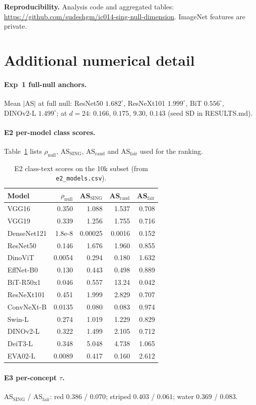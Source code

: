 \documentclass[10pt,twocolumn]{article}
\begin{document}
\vspace{0.4em}
\noindent\textbf{Reproducibility.}
Analysis code and aggregated tables: \url{https://github.com/sudeshgm/ic014-sing-null-dimension}.
ImageNet features are private.

{\small


}

\appendix
\section{Additional numerical detail}
\vspace{-0.2em}
\paragraph{Exp~1 full-null anchors.}
Mean $|$AS$|$ at full null: ResNet50 $1.682^\circ$, ResNeXt101 $1.999^\circ$, BiT $0.556^\circ$, DINOv2-L $1.499^\circ$; at $d{=}24$: $0.166$, $0.175$, $9.30$, $0.143$ (seed SD in RESULTS.md).

\paragraph{E2 per-model class scores.}
Table~\ref{tab:e2models} lists $\rho_{\mathrm{null}}$, $\mathrm{AS}_{\mathrm{SING}}$, $\mathrm{AS}_{\mathrm{rand}}$ and $\mathrm{AS}_{\mathrm{fair}}$ used for the ranking.

\begin{table}[h]
\centering
\scriptsize
\setlength{\tabcolsep}{2.5pt}
\begin{tabular}{@{}lrrrr@{}}
\toprule
Model & $\rho_{\mathrm{null}}$ & AS$_{\mathrm{SING}}$ & AS$_{\mathrm{rand}}$ & AS$_{\mathrm{fair}}$ \\
\midrule
VGG16       & 0.350 & 1.088 & 1.537 & 0.708 \\
VGG19       & 0.339 & 1.256 & 1.755 & 0.716 \\
DenseNet121 & 1.8e-8 & 0.00025 & 0.0016 & 0.152 \\
ResNet50    & 0.146 & 1.676 & 1.960 & 0.855 \\
DinoViT     & 0.0054 & 0.294 & 0.180 & 1.632 \\
EffNet-B0   & 0.130 & 0.443 & 0.498 & 0.889 \\
BiT-R50x1   & 0.046 & 0.557 & 13.24 & 0.042 \\
ResNeXt101  & 0.451 & 1.999 & 2.829 & 0.707 \\
ConvNeXt-B  & 0.0135 & 0.080 & 0.083 & 0.974 \\
Swin-L      & 0.274 & 1.019 & 1.229 & 0.829 \\
DINOv2-L    & 0.322 & 1.499 & 2.105 & 0.712 \\
DeiT3-L     & 0.348 & 5.048 & 4.738 & 1.065 \\
EVA02-L     & 0.0089 & 0.417 & 0.160 & 2.612 \\
\bottomrule
\end{tabular}
\vspace{-0.3em}
\caption{E2 class-text scores on the 10k subset (from \texttt{e2\_models.csv}).}
\label{tab:e2models}
\end{table}

\paragraph{E3 per-concept $\tau$.}
AS$_{\mathrm{SING}}$ / AS$_{\mathrm{fair}}$:
red $0.386$ / $0.070$;
striped $0.403$ / $0.061$;
water $0.369$ / $0.083$.
\end{document}
